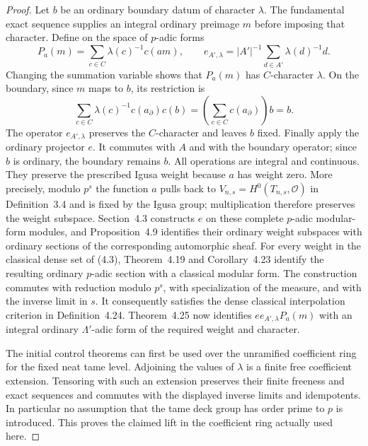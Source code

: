 \begin{proof}
Let $b$ be an ordinary boundary datum of character $\lambda$.
The fundamental exact sequence supplies an integral
ordinary preimage $m$ before imposing that character.
Define on the space of $p$-adic forms
\[
 P_a(m)=\sum_{c\in C}\lambda(c)^{-1}c(a m),\qquad
 e_{A',\lambda}=|A'|^{-1}
                   \sum_{d\in A'}\lambda(d)^{-1}d.
                                                        \tag{G67.10}
\]
Changing the summation variable shows that $P_a(m)$ has
$C$-character $\lambda$.  On the boundary, since $m$ maps
to $b$, its restriction is
\[
 \sum_{c\in C}\lambda(c)^{-1}c(a_\partial)c(b)
       =\left(\sum_{c\in C}c(a_\partial)\right)b=b.
\]
The operator $e_{A',\lambda}$ preserves the $C$-character
and leaves $b$ fixed.  Finally apply the ordinary projector
$e$.  It commutes with $A$ and with the boundary operator;
since $b$ is ordinary, the boundary remains $b$.
All operations are integral and continuous.  They preserve
the prescribed Igusa weight because $a$ has weight zero.
More precisely, modulo $p^s$ the function $a$ pulls back to
$V_{n,s}=H^0(T_{n,s},\mathcal O)$ in Definition~3.4 and is
fixed by the Igusa group; multiplication therefore preserves
the weight subspace.  Section~4.3 constructs $e$ on these
complete $p$-adic modular-form modules, and Proposition~4.9
identifies their ordinary weight subspaces with ordinary
sections of the corresponding automorphic sheaf.  For every
weight in the classical dense set of (4.3), Theorem~4.19 and
Corollary~4.23 identify the resulting ordinary $p$-adic
section with a classical modular form.  The construction
commutes with reduction modulo $p^s$, with specialization of
the measure, and with the inverse limit in $s$.
It consequently satisfies the dense classical interpolation
criterion in Definition~4.24.  Theorem~4.25 now identifies
$e e_{A',\lambda}P_a(m)$ with an integral ordinary
$\Lambda'$-adic form of the required weight and character.

The initial control theorems can first be used over the
unramified coefficient ring for the fixed neat tame level.
Adjoining the values of $\lambda$ is a finite free
coefficient extension.  Tensoring with such an extension
preserves their finite freeness and exact sequences and
commutes with the displayed inverse limits and idempotents.
In particular no assumption that the tame deck group has
order prime to $p$ is introduced.  This proves the claimed
lift in the coefficient ring actually used here.
\end{proof}

